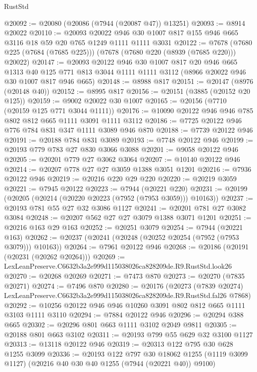 \begin{lexlean}{RustStd}
\begin{coremodule}
@20092 := @20080 (@20086 (@7944 (@20087 @47)) @13251)
@20093 := @8914 @20022
@20110 := @20093
    @20022
    @946
    @30
    @1007
    @817
    @155
    @946
    @665
    @3116
    @18
    @59
    @20
    @765
    @1249
    @1111
    @1111
    @3031
@20122 := @7678 (@7680 @225 (@7684 (@7685 @225))) (@7678 (@7680 @220 (@8939 (@7685 @220))) @20022)
@20147 := @20093
    @20122
    @946
    @30
    @1007
    @817
    @20
    @946
    @665
    @1313
    @40
    @125
    @771
    @813
    @3044
    @1111
    @1111
    @3112
    (@8966 @20022 @946 @30 @1007 @817 @946 @665)
@20148 := @8988 @817
@20151 := @20147 (@8976 (@20148 @40))
@20152 := @8995 @817
@20156 := @20151 (@3885 (@20152 @20 @125))
@20159 := @9002 @20022 @30 @1007
@20165 := @20156 (@7710 (@20159 @125 @771 @3044 @1111))
@20176 := @10090 @20122 @946 @946 @785 @802 @812 @665 @1111 @3091 @1111 @3112
@20186 := @7725 @20122 @946 @776 @784 @831 @347 @1111 @3089 @946 @870
@20188 := @7739 @20122 @946
@20191 := @20188 @784 @831 @3089
@20193 := @7748 @20122 @946
@20199 := @20193 @779 @783 @27 @830 @3066 @3088
@20201 := @9058 @20122 @946
@20205 := @20201 @779 @27 @3062 @3064
@20207 := @10140 @20122 @946
@20214 := @20207 @778 @27 @27 @3059 @1388 @3051 @1201
@20216 := @7936 @20122 @946
@20219 := @20216 @220 @29 @220
@20220 := @20219 @3059
@20221 := @7945 @20122
@20223 := @7944 (@20221 @220)
@20231 := @20199 (@20205 (@20214 (@20220 @20223 (@7952 (@7953 @3059))) @10163))
@20237 := @20193 @781 @55 @27 @32 @3086 @1127
@20241 := @20201 @781 @27 @3082 @3084
@20248 := @20207 @562 @27 @27 @3079 @1388 @3071 @1201
@20251 := @20216 @163 @29 @163
@20252 := @20251 @3079
@20254 := @7944 (@20221 @163)
@20262 := @20237 (@20241 (@20248 (@20252 @20254 (@7952 (@7953 @3079))) @10163))
@20264 := @7961 @20122 @946
@20268 := @20186 (@20191 (@20231 (@20262 @20264)))
@20269 := LexLeanPreserve.C6632b3a2e999d115038026ca828209de.R9.RustStd.look26
@20270 := @20268 @20269
@20271 := @7473 @870
@20273 := @20270 (@7835 @20271)
@20274 := @7496 @870
@20280 := @20176
    (@20273 (@7839 @20274) LexLeanPreserve.C6632b3a2e999d115038026ca828209de.R9.RustStd.fal26 @7868)
@20292 := @10256 @20122 @946 @946 @10260 @3091 @802 @812 @665 @1111 @3103 @1111 @3110
@20294 := @7884 @20122 @946
@20296 := @20294 @388 @665
@20302 := @20296 @801 @663 @1111 @3102 @2049 @9811
@20305 := @20188 @801 @663 @3102
@20311 := @20193 @799 @55 @629 @32 @3100 @1127
@20313 := @13118 @20122 @946
@20319 := @20313 @122 @795 @30 @628 @1255 @3099
@20336 := @20193
    @122
    @797
    @30
    @18062
    @1255
    (@1119 @3099 @1127)
    (@20216 @40 @30 @40 @1255 (@7944 (@20221 @40)) @9100)

\end{coremodule}
\end{lexlean}
